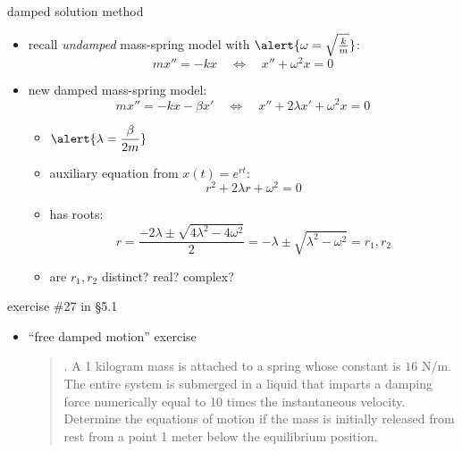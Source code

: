 \documentclass[dvipsnames,colorlinks]{beamer}
\begin{document}
\begin{frame}{damped solution method}

\begin{itemize}
\item recall \emph{undamped} mass-spring model with $\alert{\omega = \sqrt{\frac{k}{m}}}$:
    $$m x'' = - k x \quad \iff \quad x'' + \omega^2 x = 0$$
\item new damped mass-spring model:
    $$m x'' = - k x - \beta x' \quad \iff \quad x'' + 2 \lambda x' + \omega^2 x = 0$$

\vspace{-2mm}
    \begin{itemize}
    \item $\displaystyle \alert{\lambda = \frac{\beta}{2m}}$

\vspace{1mm}
    \item auxiliary equation from $x(t)=e^{rt}$:
        $$r^2 + 2\lambda r + \omega^2=0$$

\vspace{-2mm}
    \item has roots:
        $$r = \frac{-2\lambda \pm \sqrt{4 \lambda^2 - 4 \omega^2}}{2} = -\lambda \pm \sqrt{\lambda^2 - \omega^2}=r_1,r_2$$

\vspace{-2mm}
    \item are $r_1,r_2$ distinct? real? complex?
    \end{itemize}
\end{itemize}
\end{frame}


\begin{frame}{exercise \#27 in \S5.1}

\begin{itemize}
\item ``free damped motion'' exercise

\medskip
\begin{quotation}
. A 1 kilogram mass is attached to a spring whose constant is $16$ N/m.  The entire system is submerged in a liquid that imparts a damping force numerically equal to 10 times the instantaneous velocity.  Determine the equations of motion if the mass is initially released from rest from a point 1 meter below the equilibrium position.\end{quotation}
\end{itemize}

\vspace{40mm}
\end{frame}
\end{document}
